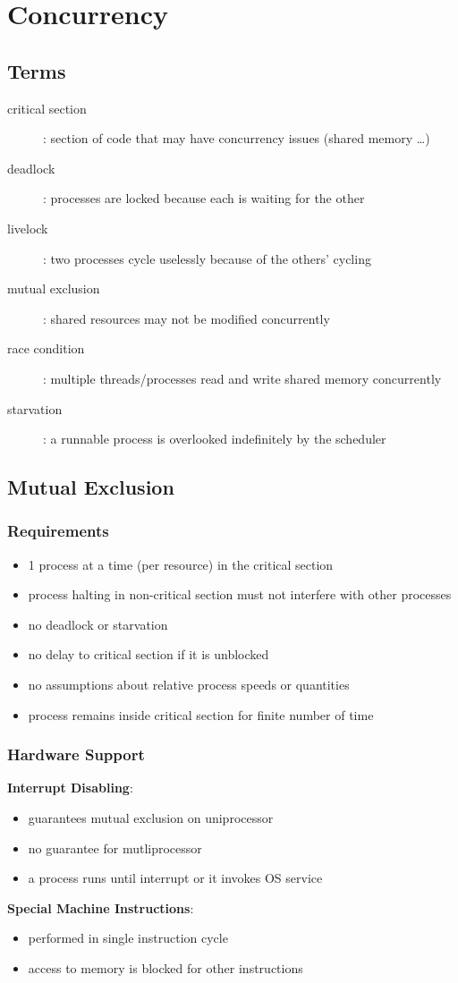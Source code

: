 \documentclass[]{article}
\theoremstyle{definition}
\begin{document}
	\section{Concurrency}
		\subsection{Terms}
			\begin{description}
				\item[critical section]: section of code that may have concurrency issues (shared memory \ldots)
				\item[deadlock]: processes are locked because each is waiting for the other
				\item[livelock]: two processes cycle uselessly because of the others' cycling
				\item[mutual exclusion]: shared resources may not be modified concurrently
				\item[race condition]: multiple threads/processes read and write shared memory concurrently
				\item[starvation]: a runnable process is overlooked indefinitely by the scheduler
			\end{description}
		\subsection{Mutual Exclusion}
			\subsubsection{Requirements}
				\begin{itemize}
					\item 1 process at a time (per resource) in the critical section
					\item process halting in non-critical section must not interfere with other processes
					\item no deadlock or starvation
					\item no delay to critical section if it is unblocked
					\item no assumptions about relative process speeds or quantities
					\item process remains inside critical section for finite number of time
				\end{itemize}
			\subsubsection{Hardware Support}
				\textbf{Interrupt Disabling}:
				\begin{itemize}
					\item guarantees mutual exclusion on uniprocessor
					\item no guarantee for mutliprocessor
					\item a process runs until interrupt or it invokes OS service
				\end{itemize}
				\textbf{Special Machine Instructions}:
				\begin{itemize}
					\item performed in single instruction cycle
					\item access to memory is blocked for other instructions
				\end{itemize}
		
\end{document}
